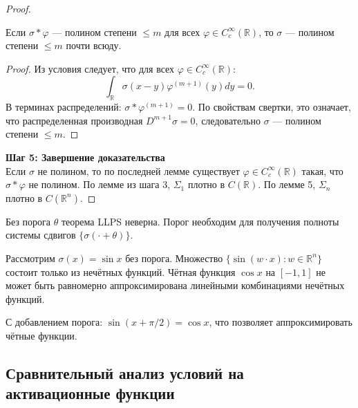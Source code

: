 \documentclass[../NDCNNAI_main.tex]{subfiles}
\begin{document}
\begin{proof}
\begin{lemma}
Если $\sigma * \varphi$ --- полином степени $\leq m$ для всех $\varphi \in C^\infty_c(\mathbb{R})$, то $\sigma$ --- полином степени $\leq m$ почти всюду.
\end{lemma}

\begin{proof}
Из условия следует, что для всех $\varphi \in C^\infty_c(\mathbb{R})$:
\[
\int_{\mathbb{R}} \sigma(x-y) \varphi^{(m+1)}(y) dy = 0.
\]
В терминах распределений: $\sigma * \varphi^{(m+1)} = 0$. По свойствам свертки, это означает, что распределенная производная $D^{m+1}\sigma = 0$, следовательно $\sigma$ --- полином степени $\leq m$.
\end{proof}

\noindent
\textbf{Шаг 5: Завершение доказательства}\\
Если $\sigma$ не полином, то по последней лемме существует $\varphi \in C^\infty_c(\mathbb{R})$ такая, что $\sigma * \varphi$ не полином. По лемме из шага 3, $\Sigma_1$ плотно в $C(\mathbb{R})$. По лемме 5, $\Sigma_n$ плотно в $C(\mathbb{R}^n)$.
\end{proof}

\begin{remark}
Без порога $\theta$ теорема LLPS неверна. Порог необходим для получения полноты системы сдвигов $\{\sigma(\cdot + \theta)\}$.
\end{remark}

\begin{example}
Рассмотрим $\sigma(x) = \sin x$ без порога. Множество $\{\sin(w \cdot x)\colon w \in \mathbb{R}^n\}$ состоит только из нечётных функций. Чётная функция $\cos x$ на $[-1, 1]$ не может быть равномерно аппроксимирована линейными комбинациями нечётных функций.

С добавлением порога: $\sin(x + \pi/2) = \cos x$, что позволяет аппроксимировать чётные функции.
\end{example}

\subsection{Сравнительный анализ условий на активационные функции}
\end{document}
